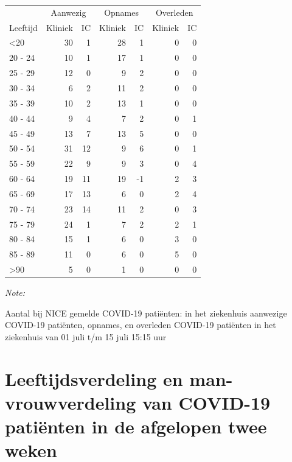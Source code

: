 \documentclass[
  english,
  man,floatsintext]{apa6}
\begin{document}
\begin{table}
\centering\begingroup\fontsize{10}{12}\selectfont

\begin{threeparttable}
\begin{tabular}{lrrrrrr}
\toprule
\multicolumn{1}{c}{ } & \multicolumn{2}{c}{Aanwezig} & \multicolumn{2}{c}{Opnames} & \multicolumn{2}{c}{Overleden} \\
\cmidrule(l{3pt}r{3pt}){2-3} \cmidrule(l{3pt}r{3pt}){4-5} \cmidrule(l{3pt}r{3pt}){6-7}
Leeftijd & Kliniek & IC & Kliniek & IC & Kliniek & IC\\
\midrule
<20 & 30 & 1 & 28 & 1 & 0 & 0\\
20 - 24 & 10 & 1 & 17 & 1 & 0 & 0\\
25 - 29 & 12 & 0 & 9 & 2 & 0 & 0\\
30 - 34 & 6 & 2 & 11 & 2 & 0 & 0\\
35 - 39 & 10 & 2 & 13 & 1 & 0 & 0\\
40 - 44 & 9 & 4 & 7 & 2 & 0 & 1\\
45 - 49 & 13 & 7 & 13 & 5 & 0 & 0\\
50 - 54 & 31 & 12 & 9 & 6 & 0 & 1\\
55 - 59 & 22 & 9 & 9 & 3 & 0 & 4\\
60 - 64 & 19 & 11 & 19 & -1 & 2 & 3\\
65 - 69 & 17 & 13 & 6 & 0 & 2 & 4\\
70 - 74 & 23 & 14 & 11 & 2 & 0 & 3\\
75 - 79 & 24 & 1 & 7 & 2 & 2 & 1\\
80 - 84 & 15 & 1 & 6 & 0 & 3 & 0\\
85 - 89 & 11 & 0 & 6 & 0 & 5 & 0\\
>90 & 5 & 0 & 1 & 0 & 0 & 0\\
\bottomrule
\end{tabular}
\begin{tablenotes}
\item \textit{Note: } 
\item Aantal bij NICE gemelde COVID-19 patiënten: in het ziekenhuis aanwezige COVID-19 patiënten, opnames, en overleden COVID-19 patiënten in het ziekenhuis van 01 juli t/m 15 juli 15:15 uur
\end{tablenotes}
\end{threeparttable}
\endgroup{}
\end{table}

\newpage

\hypertarget{leeftijdsverdeling-en-man-vrouwverdeling-van-covid-19-patiuxebnten-in-de-afgelopen-twee-weken}{%
\section{Leeftijdsverdeling en man-vrouwverdeling van COVID-19 patiënten in de afgelopen twee weken}\label{leeftijdsverdeling-en-man-vrouwverdeling-van-covid-19-patiuxebnten-in-de-afgelopen-twee-weken}}
\end{document}
